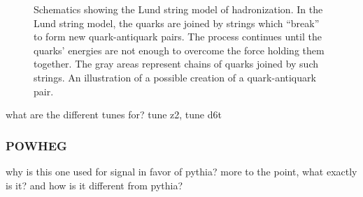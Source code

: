  \begin{figure}[htb]
  \begin{center}
  \end{center}
  \caption[Schematics showing the Lund string model of hadronization]
	  {Schematics showing the Lund string model of hadronization.
	   In the Lund string model, the quarks 
	  are joined by strings which ``break'' to form new 
	  quark-antiquark pairs. 
	  The process continues until the quarks' energies are  
	  not enough to overcome the force holding them together.  
	  The gray areas represent chains of quarks joined by such strings.  
	   An illustration of a possible 
	  creation of a quark-antiquark pair.  
	  }
  \label{fig:MClund}
 \end{figure}



what are the different tunes for?  tune z2, tune d6t

\subsubsection{POWHEG}
\label{sim:MCGensPowheg}
why is this one used for signal in favor of pythia?  
more to the point, what exactly is it? 
and how is it different from pythia? 

